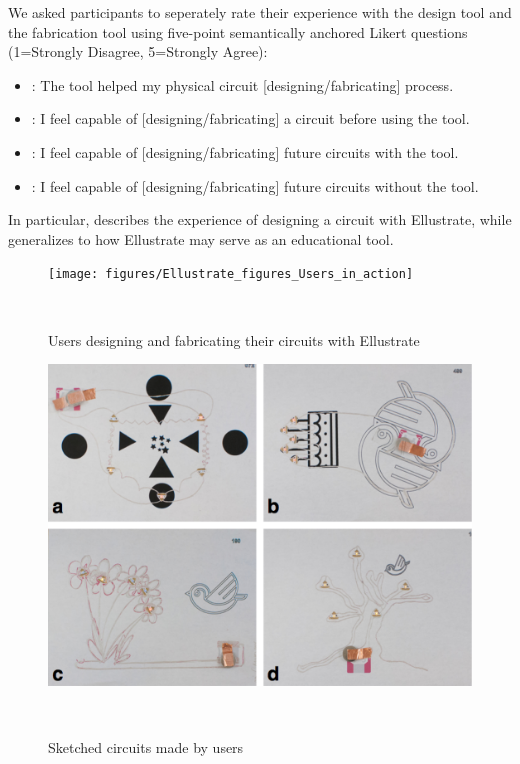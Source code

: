 \documentclass{sigchi}
\begin{document}
    We asked participants to seperately rate their experience with the design tool and the fabrication tool using five-point semantically anchored Likert questions (1=Strongly Disagree, 5=Strongly Agree):
    \begin{itemize}
      \item {}: The tool helped my physical circuit [designing/fabricating] process.
      \item {}: I feel capable of [designing/fabricating] a circuit before using the tool.
      \item {}: I feel capable of [designing/fabricating] future circuits with the tool.
      \item {}: I feel capable of [designing/fabricating] future circuits without the tool.
    \end{itemize}
    In particular,  describes the experience of designing a circuit with Ellustrate, while  generalizes to how Ellustrate may serve as an educational tool.

\begin{figure}[h]
\centering
  \texttt{[image: figures/Ellustrate\_figures\_Users\_in\_action]}
  \caption{Users designing and fabricating their circuits with Ellustrate}~\label{fig:users-in-action}
\end{figure}


\begin{figure}[h]
\centering
  \includegraphics[width=1\columnwidth]{figures/Ellustrate_figures_Users_artwork}
  \caption{Sketched circuits made by users}~\label{fig:user-artwork}
\end{figure}
\end{document}
